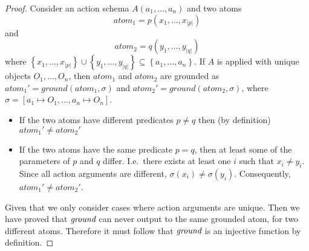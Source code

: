 \documentclass[../Master.tex]{subfiles}
\begin{document}
\begin{proof}
    Consider an action schema $A\left(a_1, \dots, a_n\right)$ and two atoms 
    \begin{equation*}
        atom_1 = p\left(x_1, \dots, x_{|p|}\right)
    \end{equation*}
    and
    \begin{equation*}
       atom_2 = q\left(y_1, \dots, y_{|q|}\right)
    \end{equation*}
    where $\left\{ x_1, \dots, x_{|p|}\right\} \cup \left\{ y_1, \dots, y_{|q|}\right\} \subseteq \left\{a_1, \dots, a_n\right\}$. If $A$ is applied with unique objects $O_1, \dots, O_n$, 
    then $atom_1$ and $atom_2$ are grounded as $atom_1' = ground(atom_1, \sigma)$ and $atom_2' = ground(atom_2,\sigma)$, where $\sigma = \left[ a_1 \mapsto O_1, \dots, a_n \mapsto O_n \right]$.

	\begin{itemize}
		\item If the two atoms have different predicates $p \neq q$ then (by definition) $atom_1' \neq atom_2'$
		
        \item If the two atoms have the same predicate $p = q$, then at least some of the parameters of $p$ and $q$ differ. I.e.\ there exists at least one $i$ such that $x_i \neq y_i$. Since all action arguments are different, $\sigma\left( x_i \right) \neq \sigma\left( y_i \right)$. Consequently, $atom_1' \neq atom_2'$.
	\end{itemize}	
	Given that we only consider cases where action arguments are unique. 
	Then we have proved that $\textit{ground}$ can never output to the same grounded atom, for two different atoms. Therefore it must follow that $\textit{ground}$ is an injective function by definition.
\end{proof}
\end{document}
